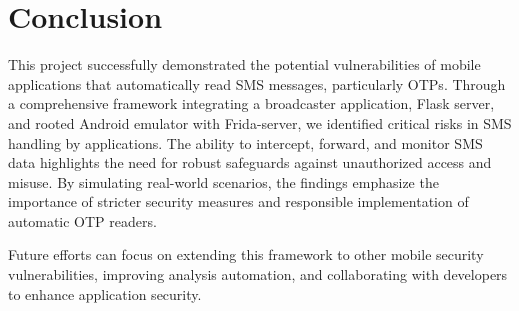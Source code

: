 \documentclass[a4paper,12pt]{article}
\begin{document}
\section{Conclusion}  
This project successfully demonstrated the potential vulnerabilities of mobile applications that automatically read SMS messages, particularly OTPs. Through a comprehensive framework integrating a broadcaster application, Flask server, and rooted Android emulator with Frida-server, we identified critical risks in SMS handling by applications. The ability to intercept, forward, and monitor SMS data highlights the need for robust safeguards against unauthorized access and misuse. By simulating real-world scenarios, the findings emphasize the importance of stricter security measures and responsible implementation of automatic OTP readers.  

Future efforts can focus on extending this framework to other mobile security vulnerabilities, improving analysis automation, and collaborating with developers to enhance application security.  
\end{document}
